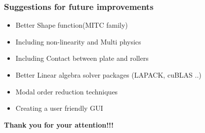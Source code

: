 \documentclass[9pt]{beamer}
\begin{document}
\begin{frame}\frametitle{Suggestions for future improvements}
\begin{itemize}
\item Better Shape function(MITC family)
\item Including non-linearity and Multi physics
\item Including Contact between plate and rollers
\item Better Linear algebra solver packages (LAPACK, cuBLAS ..)
\item Modal order reduction  techniques
\item Creating a user friendly GUI
\end{itemize}
\end{frame}

\begin{frame}
\begin{center}
\begin{LARGE}
\textbf{Thank you for your attention!!!}
\end{LARGE}
\end{center}


\end{frame}
\end{document}
